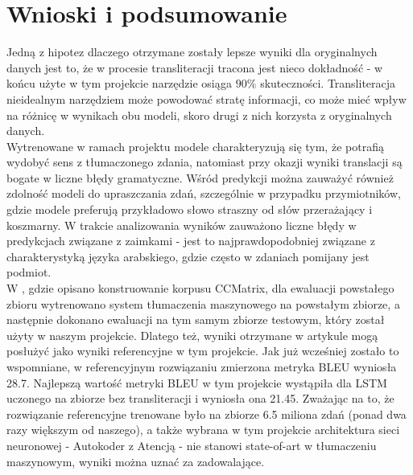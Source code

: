 \documentclass[
    left=2.5cm,         %
    right=2.5cm,        %
    top=2.5cm,          %
    bottom=3cm,         %
    bindingoffset=6mm,  %
    nohyphenation=false %
]{eiti/eiti-report}
\begin{document}
\newpage

\section{Wnioski i podsumowanie}
Jedną z hipotez dlaczego otrzymane zostały lepsze wyniki dla oryginalnych danych jest to, że w procesie transliteracji tracona jest nieco dokładność - w końcu użyte w tym projekcie narzędzie osiąga $90\%$ skuteczności. Transliteracja nieidealnym narzędziem może powodować stratę informacji, co może mieć wpływ na różnicę w wynikach obu modeli, skoro drugi z nich korzysta z oryginalnych danych.\\


Wytrenowane w ramach projektu modele charakteryzują się tym, że potrafią wydobyć sens z tłumaczonego zdania, natomiast przy okazji wyniki translacji są bogate w liczne błędy gramatyczne. Wśród predykcji można zauważyć również zdolność modeli do upraszczania zdań, szczególnie w przypadku przymiotników, gdzie modele preferują przykładowo słowo straszny od słów przerażający i koszmarny. W trakcie analizowania wyników zauważono liczne błędy w predykcjach związane z zaimkami - jest to najprawdopodobniej związane z charakterystyką języka arabskiego, gdzie często w zdaniach pomijany jest podmiot.\\


W \cite{CCmatrix}, gdzie opisano konstruowanie korpusu CCMatrix, dla ewaluacji powstałego zbioru wytrenowano system tłumaczenia maszynowego na powstałym zbiorze, a następnie dokonano ewaluacji na tym samym zbiorze testowym, który został użyty w naszym projekcie. Dlatego też, wyniki otrzymane w artykule mogą posłużyć jako wyniki referencyjne w tym projekcie. Jak już wcześniej zostało to wspomniane, w referencyjnym rozwiązaniu zmierzona metryka BLEU wyniosła 28.7. Najlepszą wartość metryki BLEU w tym projekcie wystąpiła dla LSTM uczonego na zbiorze bez transliteracji i wyniosła ona 21.45. Zważając na to, że rozwiązanie referencyjne trenowane było na zbiorze 6.5 miliona zdań (ponad dwa razy większym od naszego), a także wybrana w tym projekcie architektura sieci neuronowej - Autokoder z Atencją - nie stanowi state-of-art w tłumaczeniu maszynowym, wyniki można uznać za zadowalające.

\clearpage
\printbibliography
\end{document}
